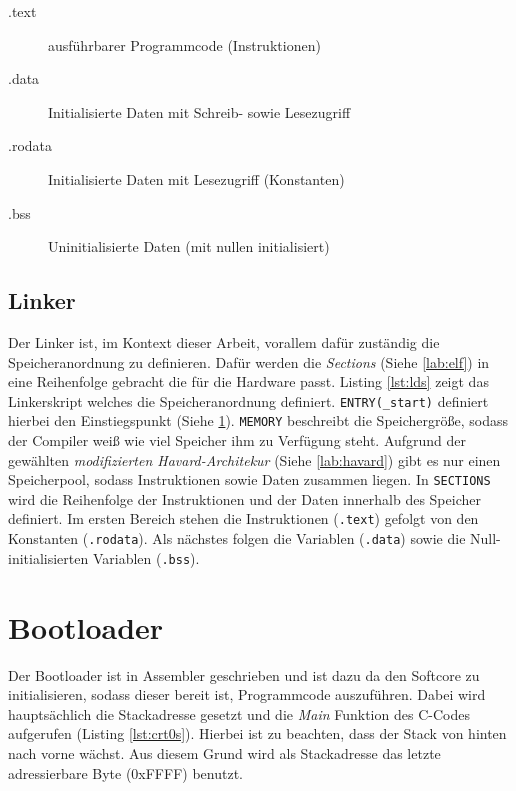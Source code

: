         \begin{description}
            \item[.text] ausführbarer Programmcode (Instruktionen)
            \item[.data] Initialisierte Daten mit Schreib- sowie Lesezugriff
            \item[.rodata] Initialisierte Daten mit Lesezugriff (Konstanten)
            \item[.bss] Uninitialisierte Daten (mit nullen initialisiert)
        \end{description}
    
    \subsection{Linker}
        Der Linker ist, im Kontext dieser Arbeit, vorallem dafür zuständig
        die Speicheranordnung zu definieren. Dafür werden die \textit{Sections} (Siehe \ref{lab:elf})
        in eine Reihenfolge gebracht die für die Hardware passt.
        Listing \ref{lst:lds} zeigt das Linkerskript welches die Speicheranordnung definiert.
        \texttt{ENTRY(\_start)} definiert hierbei den Einstiegspunkt (Siehe \ref{lab:bootloader}).
        \texttt{MEMORY} beschreibt die Speichergröße, sodass der Compiler weiß wie
        viel Speicher ihm zu Verfügung steht. Aufgrund der gewählten \textit{modifizierten Havard-Architekur} (Siehe \ref{lab:havard})
        gibt es nur einen Speicherpool, sodass Instruktionen sowie Daten zusammen liegen.
        In \texttt{SECTIONS} wird die Reihenfolge der Instruktionen und der Daten innerhalb des Speicher
        definiert. Im ersten Bereich stehen die Instruktionen (\texttt{.text}) gefolgt von den Konstanten (\texttt{.rodata}).
        Als nächstes folgen die Variablen (\texttt{.data}) sowie die Null-initialisierten Variablen (\texttt{.bss}).
        
        

    \section{Bootloader}\label{lab:bootloader}

        Der Bootloader ist in Assembler geschrieben und ist dazu da den
        Softcore zu initialisieren, sodass dieser bereit ist, Programmcode auszuführen.
        Dabei wird hauptsächlich die Stackadresse gesetzt und die \textit{Main}
        Funktion des C-Codes aufgerufen  (Listing \ref{lst:crt0s}).
        Hierbei ist zu beachten, dass der Stack von hinten nach vorne wächst.
        Aus diesem Grund wird als Stackadresse das letzte adressierbare Byte (0xFFFF) benutzt.
        

